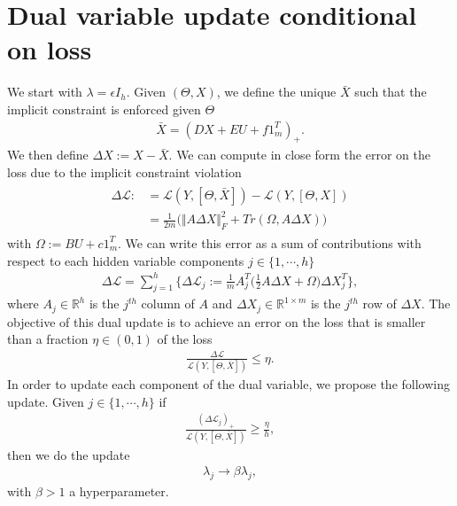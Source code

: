 \documentclass[letterpaper,10pt,english]{sphinxmanual}
\begin{document}
\section{Dual variable update conditional on loss}
\label{\detokenize{sections/dual_ascents:dual-variable-update-conditional-on-loss}}
We start with \(\lambda = \epsilon I_h\). Given \((\Theta,X)\), we define the unique \(\bar{X}\) such that the implicit constraint
is enforced given \(\Theta\)
\begin{equation*}
\begin{split}\bar{X} = (DX + EU + f1_m^T)_+.\end{split}
\end{equation*}
We then define \(\Delta X := X - \bar{X}\). We can compute in close form the error on the loss due to the implicit
constraint violation
\begin{equation*}
\begin{split}\begin{align}
    \Delta \mathcal{L} :&= \mathcal{L}(Y,[\Theta,\bar{X}]) - \mathcal{L}(Y,[\Theta,X]) \\
    &= \frac{1}{2m} \bigg(\Vert A \Delta X \Vert_F^2 + Tr(\Omega,A \Delta X) \bigg)
\end{align}\end{split}
\end{equation*}
with \(\Omega := BU + c1_m^T\). We can write this error as a sum of contributions with respect to each hidden variable
components \(j \in \{1,\cdots,h\}\)
\begin{equation*}
\begin{split}\Delta \mathcal{L} = \sum_{j=1}^h \bigg\{ \Delta \mathcal{L}_j := \frac{1}{m} A_j^T \bigg( \frac{1}{2} A \Delta X + \Omega \bigg) \Delta X_j^T \bigg\},\end{split}
\end{equation*}
where \(A_j \in \mathbb{R}^h\) is the \(j^{th}\) column of \(A\) and \(\Delta X_j \in \mathbb{R}^{1 \times m}\) is the \(j^{th}\)
row of \(\Delta X\). The objective of this dual update is to achieve an error on the loss that is smaller than a fraction \(\eta \in (0,1)\) of the loss
\begin{equation*}
\begin{split}\frac{\Delta \mathcal{L}}{\mathcal{L}(Y,[\Theta,\bar{X}])} \leq \eta.\end{split}
\end{equation*}
In order to update each component of the dual variable, we propose the following update. Given \(j \in \{1,\cdots,h\}\) if
\begin{equation*}
\begin{split}\frac{(\Delta \mathcal{L}_j)_+}{\mathcal{L}(Y,[\Theta,\bar{X}])} \geq \frac{\eta}{h},\end{split}
\end{equation*}
then we do the update
\begin{equation*}
\begin{split}\lambda_j \rightarrow \beta \lambda_j,\end{split}
\end{equation*}
with \(\beta > 1\) a hyperparameter.
\end{document}
